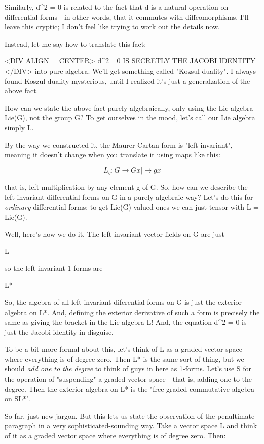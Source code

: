 Similarly, d^{2} = 0 is related to the fact that d is a natural operation 
on differential forms - in other words, that it commutes with 
diffeomorphisms.   I'll leave this cryptic; I don't feel like trying
to work out the details now.

Instead, let me say how to translate this fact:

<DIV ALIGN = CENTER>
         d^{2}\omega  = 0 IS SECRETLY THE JACOBI IDENTITY 
</DIV>
into pure algebra.  We'll get something called "Kozsul duality".
I always found Koszul duality mysterious, until I realized it's
just a generalzation of the above fact.  

How can we state the above fact purely algebraically, only
using the Lie algebra Lie(G), not the group G?  To get ourselves
in the mood, let's call our Lie algebra simply L.

By the way we constructed it, the Maurer-Cartan form is "left-invariant", 
meaning it doesn't change when you translate it using maps like this:

$$
L_{g}: G \to  G
    x |\to  gx
$$
    

that is, left multiplication by any element g of G.  So, 
how can we describe the left-invariant differential forms on G
in a purely algebraic way?  Let's do this for \emph{ordinary} differential
forms; to get Lie(G)-valued ones we can just tensor with L = Lie(G).

Well, here's how we do it.  The left-invariant vector fields on G
are just 

L

so the left-invariant 1-forms are 

L*

So, the algebra of all left-invariant diferential forms on G
is just the exterior algebra on L*.  And, defining the exterior
derivative of such a form is precisely the same as giving the
bracket in the Lie algebra L!  And, the equation d^{2} = 0 is
just the Jacobi identity in disguise.

To be a bit more formal about this, let's think of L as a graded
vector space where everything is of degree zero.  Then L* is the
same sort of thing, but we should \emph{add one to the degree} to think 
of guys in here as 1-forms.  Let's use S for the operation 
of "suspending"
a graded vector space - that is, adding one to the degree.  Then
the exterior algebra on L* is the "free graded-commutative algebra 
on SL*".

So far, just new jargon.  But this lets us state the observation
of the penultimate paragraph in a very sophisticated-sounding way.
Take a vector space L and think of it as a graded vector space
where everything is of degree zero.  Then:

